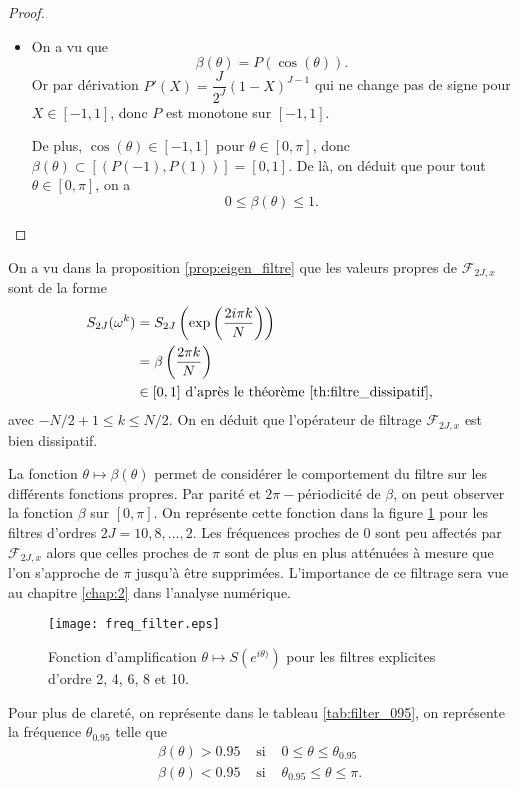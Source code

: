 \begin{proof}
\begin{itemize}
\item On a vu que
\begin{equation}
\beta(\theta) = P(\cos (\theta)).
\end{equation}
Or par dérivation $P'(X) =  \dfrac{J}{2^J}(1-X)^{J-1}$ qui ne change pas de signe pour $X \in [-1,1]$, donc $P$ est monotone sur $[-1,1]$.

De plus, $\cos(\theta) \in [-1,1]$ pour $\theta \in [0, \pi]$, donc $\beta(\theta) \subset [(P(-1), P(1))] = [0,1]$. De là, on déduit que pour tout $\theta \in [0,\pi]$, on a
\begin{equation}
0 \leq \beta(\theta) \leq 1.
\end{equation} 
\end{itemize}
\end{proof}

\begin{remarque}
On a vu dans la proposition \ref{prop:eigen_filtre} que les valeurs propres de $\mathcal{F}_{2J,x}$ sont de la forme
\begin{align*}
S_{2J}(\omega^k) & = S_{2J}\left(\exp \left( \dfrac{2 i \pi k}{N} \right) \right) \\
	& = \beta \left(\dfrac{2 \pi k}{N} \right) \\
	& \in [0,1] \text{ d'après le théorème } \ref{th:filtre_dissipatif},
\end{align*}
avec $-N/2+1 \leq k \leq N/2$. On en déduit que l'opérateur de filtrage $\mathcal{F}_{2J,x}$ est bien dissipatif.
\end{remarque}

La fonction $\theta \mapsto \beta(\theta)$ permet de considérer le comportement du filtre sur les différents fonctions propres. Par parité et $2 \pi -$périodicité de $\beta$, on peut observer la fonction $\beta$ sur $[0,\pi]$. On représente cette fonction dans la figure \ref{fig:freq_filter} pour les filtres d'ordres $2J = 10, 8, ..., 2$. Les fréquences proches de 0 sont peu affectés par $\mathcal{F}_{2J,x}$ alors que celles proches de $\pi$ sont de plus en plus atténuées à mesure que l'on s'approche de $\pi$ jusqu'à être supprimées. L'importance de ce filtrage sera vue au chapitre \ref{chap:2} dans l'analyse numérique.

\begin{figure}[htbp]
\begin{center}
\texttt{[image: freq\_filter.eps]}
\end{center}
\caption{Fonction d'amplification $\theta \mapsto S(e^{i\theta)})$ pour les filtres explicites d'ordre 2, 4, 6, 8 et 10.}
\label{fig:freq_filter}
\end{figure}
Pour plus de clareté, on représente dans le tableau \ref{tab:filter_095}, on représente la fréquence $\theta_{0.95}$ telle que
\begin{equation}
\begin{array}{rcl}
\beta(\theta) > 0.95 & \text{ si } & 0 \leq \theta \leq \theta_{0.95} \\
\beta(\theta) < 0.95 & \text{ si } & \theta_{0.95} \leq \theta \leq \pi.
\end{array}
\end{equation}

